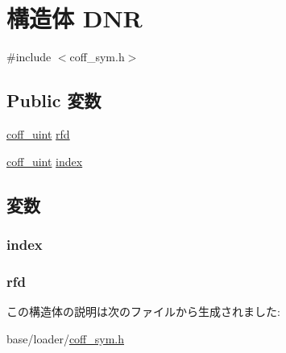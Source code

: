 \hypertarget{structDNR}{
\section{構造体 DNR}
\label{structDNR}
}


{\ttfamily \#include $<$coff\_\-sym.h$>$}\subsection*{Public 変数}
\begin{DoxyCompactItemize}
\item 
\hyperlink{ecoff__machdep_8h_ab38b7c66cf20051c3d7bb0f268d1e2a5}{coff\_\-uint} \hyperlink{structDNR_a546b54ccb3b41efc45bde58573fcf27d}{rfd}
\item 
\hyperlink{ecoff__machdep_8h_ab38b7c66cf20051c3d7bb0f268d1e2a5}{coff\_\-uint} \hyperlink{structDNR_aa00f453e8e2196a9451876eee4fe5ae1}{index}
\end{DoxyCompactItemize}


\subsection{変数}
\hypertarget{structDNR_aa00f453e8e2196a9451876eee4fe5ae1}{
\subsubsection[{index}]{ {\bf index}}}
\label{structDNR_aa00f453e8e2196a9451876eee4fe5ae1}
\hypertarget{structDNR_a546b54ccb3b41efc45bde58573fcf27d}{
\subsubsection[{rfd}]{ {\bf rfd}}}
\label{structDNR_a546b54ccb3b41efc45bde58573fcf27d}


この構造体の説明は次のファイルから生成されました:\begin{DoxyCompactItemize}
\item 
base/loader/\hyperlink{coff__sym_8h}{coff\_\-sym.h}\end{DoxyCompactItemize}
